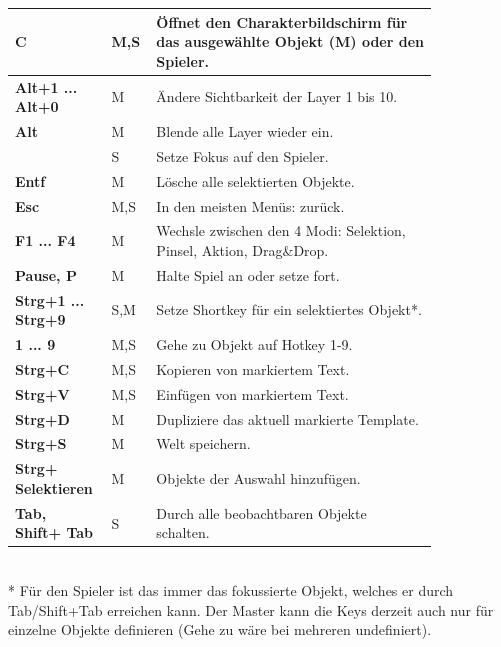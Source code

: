 \documentclass[german,10pt,a4paper,twocolumn,colorscheme=darkblue]{orarticle}
\begin{document}
		\begin{supertabular}{p{0.15\linewidth}|p{0.075\linewidth}|p{0.62\linewidth}}
			\textbf{C}               & M,S & Öffnet den Charakterbildschirm für das ausgewählte Objekt (M) oder den Spieler. \\\hline
			\textbf{Alt+1 ... Alt+0} & M & Ändere Sichtbarkeit der Layer 1 bis 10. \\\hline
			\textbf{Alt}             & M & Blende alle Layer wieder ein.\\
			                         & S & Setze Fokus auf den Spieler.\\\hline
			\textbf{Entf}			 & M & Lösche alle selektierten Objekte.\\\hline
			\textbf{Esc}			 & M,S & In den meisten Menüs: zurück.\\\hline
			\textbf{F1 ... F4}		 & M & Wechsle zwischen den 4 Modi: Selektion, Pinsel, Aktion, Drag\&Drop.\\\hline
			\textbf{Pause, P}		 & M & Halte Spiel an oder setze fort.\\\hline
			\textbf{Strg+1 ... Strg+9}& S,M & Setze Shortkey für ein selektiertes Objekt*.\\\hline
			\textbf{1 ... 9}		 & M,S & Gehe zu Objekt auf Hotkey 1-9.\\\hline
			\textbf{Strg+C}			 & M,S & Kopieren von markiertem Text.\\\hline
			\textbf{Strg+V}			 & M,S & Einfügen von markiertem Text.\\\hline
			\textbf{Strg+D}			 & M & Dupliziere das aktuell markierte Template.\\\hline
			\textbf{Strg+S}			 & M & Welt speichern.\\\hline
			\textbf{Strg+ Selektieren}& M & Objekte der Auswahl hinzufügen.\\\hline
			\textbf{Tab, Shift+ Tab}	 & S & Durch alle beobachtbaren Objekte schalten.\cr
		\end{supertabular}\\
	
		* Für den Spieler ist das immer das fokussierte Objekt, welches er durch Tab/Shift+Tab erreichen kann. Der Master kann die Keys derzeit auch nur für einzelne Objekte definieren (Gehe zu wäre bei mehreren undefiniert).
	
\end{document}
